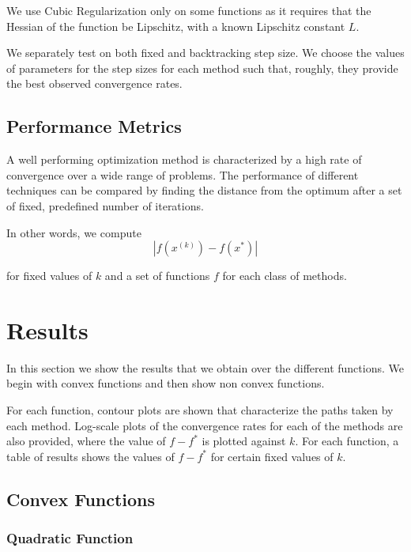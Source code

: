 \documentclass{article}
\begin{document}
We use Cubic Regularization only on some functions as it requires that the Hessian of the function be Lipschitz, with a known Lipschitz constant $L$.

We separately test on both fixed and backtracking step size. We choose the values of parameters for the step sizes for each method such that, roughly, they provide the best observed convergence rates.

\subsection{Performance Metrics}
A well performing optimization method is characterized by a high rate of convergence over a wide range of problems. The performance of different techniques can be compared by finding the distance from the optimum after a set of fixed, predefined number of iterations.

In other words, we compute
\begin{equation}
|f(x^{(k)}) - f(x^*)|
\end{equation}

for fixed values of $k$ and a set of functions $f$ for each class of methods.

\section{Results}\label{results}
In this section we show the results that we obtain over the different functions. We begin with convex functions and then show non convex functions.

For each function, contour plots are shown that characterize the paths taken by each method. Log-scale plots of the convergence rates for each of the methods are also provided, where the value of $f-f^*$ is plotted against $k$. For each function, a table of results shows the values of $f-f^*$ for certain fixed values of $k$.

\subsection{Convex Functions}

\subsubsection{Quadratic Function}
\end{document}
